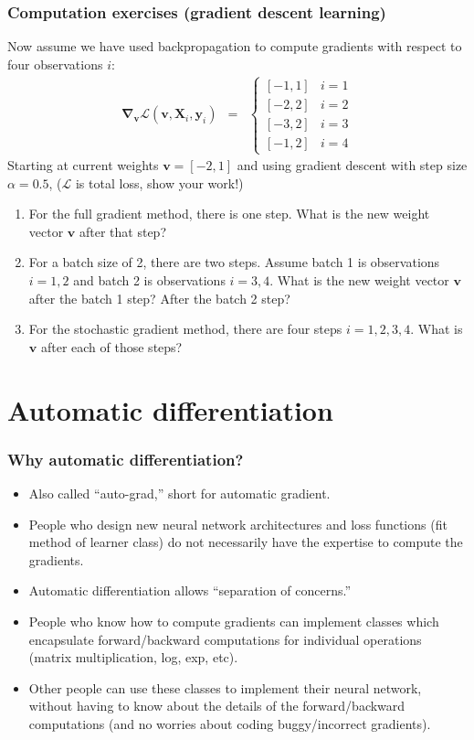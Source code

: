 \documentclass{beamer}
\begin{document}
\begin{frame}
  \frametitle{Computation exercises (gradient descent learning)}
  Now assume we have used backpropagation to compute gradients with
  respect to four observations $i$:
  \begin{eqnarray*}
    \mathbf \nabla_{\mathbf v}
    \mathcal L(\mathbf v, \mathbf X_i,\mathbf y_i)
    &=& \begin{cases}
      [-1, 1] & i=1\\
      [-2, 2] & i=2\\
      [-3, 2] & i=3\\
      [-1, 2] & i=4
    \end{cases} 
  \end{eqnarray*}
  Starting at current weights $\mathbf v=[-2, 1]$ and using gradient descent
  with step size $\alpha=0.5$,   ($\mathcal L$ is total loss, show your work!)

  \begin{enumerate}
  \item For the full gradient method, there is one step. What is the
    new weight vector $\mathbf v$ after that step?
  \item For a batch size of 2, there are two steps. Assume batch 1 is
    observations $i=1,2$ and batch 2 is observations $i=3,4$. What is the new
    weight vector $\mathbf v$ after the batch 1 step? After the batch
    2 step?
  \item For the stochastic gradient method, there are four steps
    $i=1,2,3,4$. What is $\mathbf v$ after each
    of those steps?
  \end{enumerate}
\end{frame}

\section{Automatic differentiation}

\begin{frame}
  \frametitle{Why automatic differentiation?}
  \begin{itemize}
  \item Also called ``auto-grad,'' short for automatic gradient.
  \item People who design new neural network architectures and loss
    functions (fit method of learner class) do not necessarily have
    the expertise to compute the gradients.
  \item Automatic differentiation allows ``separation of concerns.''
  \item People who know how to compute gradients can implement classes
    which encapsulate forward/backward computations for individual
    operations (matrix multiplication, log, exp, etc).
  \item Other people can use these classes to implement their neural
    network, without having to know about the details of the
    forward/backward computations (and no worries about coding
    buggy/incorrect gradients).
  \end{itemize}
\end{frame}
\end{document}
